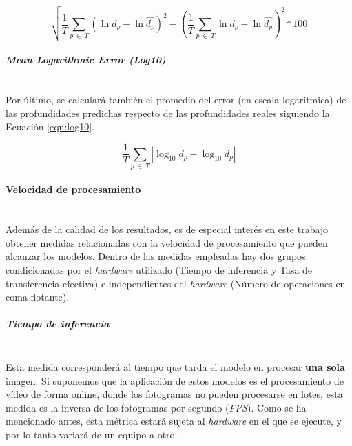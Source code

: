 
\begin{equation}
\label{eqn:silog}
\sqrt{
	\frac{1}{T} \sum_{p\ \in\ T} (\ln{d_p} - \ln{\hat{d_p}})^2
	-
	{\left(\frac{1}{T} \sum_{p\ \in\ T} \ln{d_p} - \ln{\hat{d_p}}\right)}^2
} * 100
\end{equation}

\paragraph{\textit{Mean Logarithmic Error (Log10)}}\mbox{}\\
Por último, se calculará también el promedio del error (en escala logarítmica) de las profundidades predichas respecto de las profundidades reales siguiendo la Ecuación \ref{eqn:log10}.

\begin{equation}
\label{eqn:log10}
\frac{1}{T} \sum_{p\ \in\ T} |\log_{10}{d_p} - \log_{10}{\hat{d}_p}|
\end{equation}

\paragraph{Velocidad de procesamiento}\mbox{}\\
Además de la calidad de los resultados, es de especial interés en este trabajo obtener medidas relacionadas con la velocidad de procesamiento que pueden alcanzar los modelos. Dentro de las medidas empleadas hay dos grupos: condicionadas por el \textit{hardware} utilizado (Tiempo de inferencia y Tasa de transferencia efectiva) e independientes del \textit{hardware} (Número de operaciones en coma flotante).

\subparagraph{Tiempo de inferencia}\mbox{}\\
Esta medida corresponderá al tiempo que tarda el modelo en procesar \textbf{una sola} imagen. Si suponemos que la aplicación de estos modelos es el procesamiento de vídeo de forma online, donde los fotogramas no pueden procesarse en lotes, esta medida es la inversa de los fotogramas por segundo (\textit{FPS}). 
Como se ha mencionado antes, esta métrica estará sujeta al \textit{hardware} en el que se ejecute, y por lo tanto variará de un equipo a otro.

